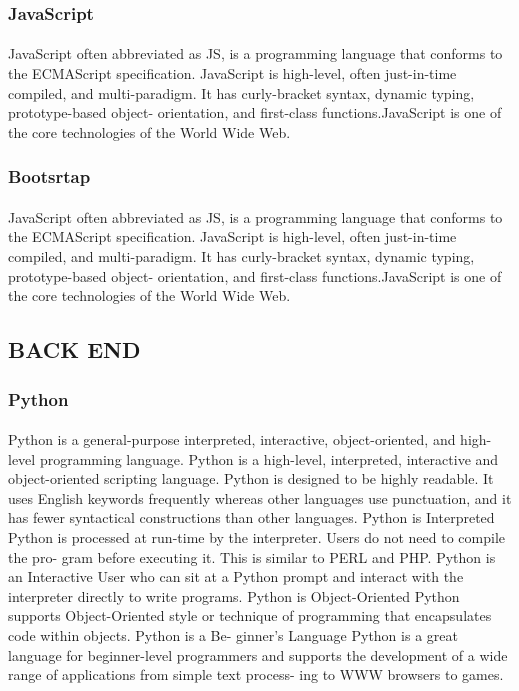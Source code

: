 \subsubsection{JavaScript}
\paragraph{} JavaScript often abbreviated as JS, is a programming language that conforms to the ECMAScript specification. JavaScript is high-level, often just-in-time compiled, and multi-paradigm. It has curly-bracket syntax, dynamic typing, prototype-based object- orientation, and first-class functions.JavaScript is one of the core technologies of the World Wide Web.

\subsubsection{Bootsrtap}
\paragraph{}JavaScript often abbreviated as JS, is a programming language that conforms to the ECMAScript specification. JavaScript is high-level, often just-in-time compiled, and multi-paradigm. It has curly-bracket syntax, dynamic typing, prototype-based object- orientation, and first-class functions.JavaScript is one of the core technologies of the World Wide Web.

\subsection{BACK END}
\subsubsection{Python}
\paragraph{}Python is a general-purpose interpreted, interactive, object-oriented, and high- level programming language. Python is a high-level, interpreted, interactive and object-oriented scripting language. Python is designed to be highly readable. It uses English keywords frequently whereas other languages use punctuation, and it has fewer syntactical constructions than other languages. Python is Interpreted Python is processed at run-time by the interpreter. Users do not need to compile the pro- gram before executing it. This is similar to PERL and PHP. Python is an Interactive User who can sit at a Python prompt and interact with the interpreter directly to write programs. Python is Object-Oriented Python supports Object-Oriented style or technique of programming that encapsulates code within objects. Python is a Be- ginner’s Language Python is a great language for beginner-level programmers and supports the development of a wide range of applications from simple text process- ing to WWW browsers to games.

